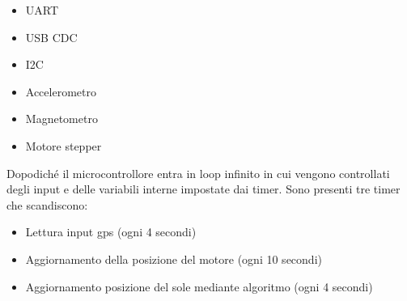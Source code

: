 \begin{itemize}
\item
  
  UART
  
\item
  
  USB CDC
  
\item
  
  I2C
  
\item
  
  Accelerometro
  
\item
  
  Magnetometro
  
\item
  
  Motore stepper
  
\end{itemize}

\noindent Dopodiché il microcontrollore entra in loop infinito in cui vengono
controllati degli input e delle variabili interne impostate dai timer.
Sono presenti tre timer che scandiscono:

\begin{itemize}
\item
  
  Lettura input gps (ogni 4 secondi)
  
\item
  
  Aggiornamento della posizione del motore (ogni 10 secondi)
  
\item
  
  Aggiornamento posizione del sole mediante algoritmo (ogni 4 secondi)
  
\end{itemize}

